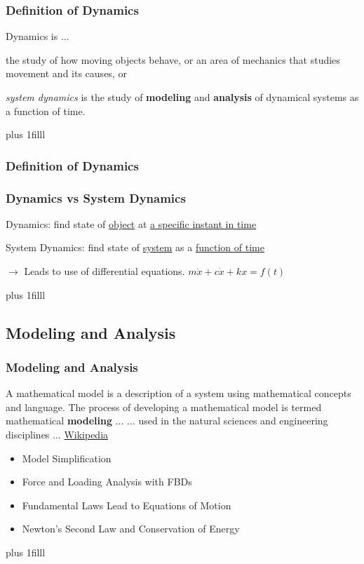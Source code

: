 \documentclass[fleqn]{beamer} %
\newcommand{\sectionIsubsectionItitle}{Definition of Dynamics}
\newcommand{\sectionIsubsectionIItitle}{Modeling and Analysis}
\newcommand{\btVFill}{\vskip0pt plus 1filll}
\begin{document}
			\begin{frame}
				\frametitle{\sectionIsubsectionItitle}
				\bigskip

				\large
				Dynamics is ...\vspcc

				the study of how moving objects behave, \vspcc
				or \vspcc
				an area of mechanics that studies movement and its causes,\vspcc
				or \vspcc

				{\it system dynamics} is the study of {\bf modeling} and {\bf analysis} of dynamical systems as a function of time.\vspc

				\btVFill
			\end{frame}

			\begin{frame}
				\frametitle{\sectionIsubsectionItitle}
				\bigskip

				\frametitle{Dynamics vs System Dynamics}

				\large
				Dynamics: find state of \underline{object} at \underline{a specific instant in time} \vspccc

				System Dynamics: find state of \underline{system} as a \underline{function of time}  \vspc

				$\rightarrow$ Leads to use of differential equations. $m\ddot{x}+c\dot{x}+kx=f(t)$

				\btVFill
			\end{frame}

		\subsection{\sectionIsubsectionIItitle}\label{sectionIsubsectionII}

			\begin{frame}
				\frametitle{\sectionIsubsectionIItitle}
				\bigskip

				A mathematical model is a description of a system using mathematical concepts and language. The process of developing a mathematical model is termed mathematical {\bf modeling} ... \vspc
				...  used in the natural sciences and engineering disciplines ...  \href{https://en.wikipedia.org/wiki/Mathematical_model}{\tiny Wikipedia}

				\begin{itemize}
					\item Model Simplification
					\item Force and Loading Analysis with FBDs
					\item Fundamental Laws Lead to Equations of Motion
					\item Newton's Second Law and Conservation of Energy
				\end{itemize}

				\btVFill
			\end{frame}
\end{document}
